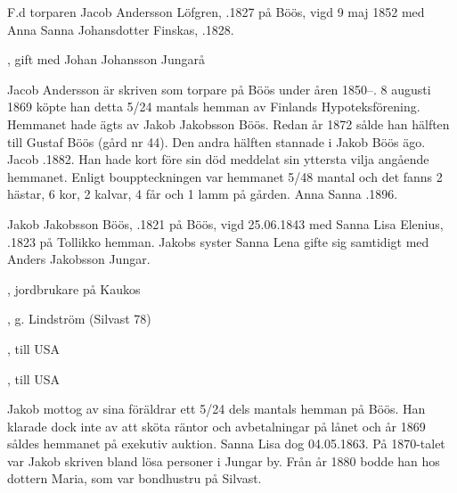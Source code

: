 F.d torparen Jacob Andersson Löfgren, .1827 på Böös, vigd 9 maj 1852 med Anna Sanna Johansdotter Finskas, .1828.
\begin{jhchildren}
  \item {}
  \item {}
  \item {}
  \item {}
  \item {}
  \item {}
  \item {}, gift med Johan Johansson Jungarå
  \item {}
\end{jhchildren}
Jacob Andersson är skriven som torpare på Böös under åren 1850--. 8 augusti 1869 köpte han detta 5/24 mantals hemman av Finlands Hypoteksförening. Hemmanet hade ägts av Jakob Jakobsson Böös. Redan år 1872 sålde han hälften till Gustaf Böös (gård nr 44). Den andra hälften stannade i Jakob Böös ägo. Jacob .1882. Han hade kort före sin död meddelat sin yttersta vilja angående hemmanet. Enligt bouppteckningen var hemmanet 5/48 mantal och det fanns 2 hästar, 6 kor, 2 kalvar, 4 får och 1 lamm på gården. Anna Sanna .1896.


Jakob Jakobsson Böös, .1821 på Böös, vigd 25.06.1843 med Sanna Lisa Elenius, .1823 på Tollikko hemman. Jakobs syster Sanna Lena gifte sig samtidigt med Anders Jakobsson Jungar.
\begin{jhchildren}
  \item {}, jordbrukare på Kaukos
  \item {}, g. Lindström (Silvast 78)
  \item {}
  \item {}, till USA
  \item {}
  \item {}
  \item {}, till USA
\end{jhchildren}
Jakob mottog av sina föräldrar ett 5/24 dels mantals hemman på Böös. Han klarade dock inte av att sköta räntor och avbetalningar på lånet och år 1869 såldes hemmanet på exekutiv auktion. Sanna Lisa dog 04.05.1863. På 1870-talet var Jakob skriven bland lösa personer i Jungar by. Från år 1880 bodde han hos dottern Maria, som var bondhustru på Silvast.

